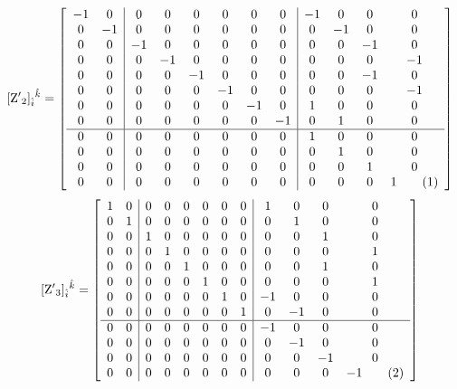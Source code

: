 \documentclass[12pt]{article}
\newcommand\numberthis{\addtocounter{equation}{1}\tag{\theequation}}
\let\bm\relax
\newcommand{\bm}[1]{{\boldsymbol{#1}}}
\begin{document}
\[[{\bm{\rm Z'}_2}]_{\hat i}{}^{\hat k}= 
\left[\begin{array}{cc|cccccc|cccc}
-1 & 0 & 0 & 0 & 0 & 0 & 0 & 0 & -1 & 0 & 0 & 0 \\
 0 & -1 & 0 & 0 & 0 & 0 & 0 & 0 & 0 & -1 & 0 & 0 \\
 0 & 0 & -1 & 0 & 0 & 0 & 0 & 0 & 0 & 0 & -1 & 0 \\
 0 & 0 & 0 & -1 & 0 & 0 & 0 & 0 & 0 & 0 & 0 & -1 \\
 0 & 0 & 0 & 0 & -1 & 0 & 0 & 0 & 0 & 0 & -1 & 0 \\
 0 & 0 & 0 & 0 & 0 & -1 & 0 & 0 & 0 & 0 & 0 & -1 \\
 0 & 0 & 0 & 0 & 0 & 0 & -1 & 0 & 1 & 0 & 0 & 0 \\
 0 & 0 & 0 & 0 & 0 & 0 & 0 & -1 & 0 & 1 & 0 & 0 \\
 \hline
0 & 0 & 0 & 0 & 0 & 0 & 0 & 0 & 1 & 0 & 0 & 0 \\
 0 & 0 & 0 & 0 & 0 & 0 & 0 & 0 & 0 & 1 & 0 & 0 \\
 0 & 0 & 0 & 0 & 0 & 0 & 0 & 0 & 0 & 0 & 1 & 0 \\
 0 & 0 & 0 & 0 & 0 & 0 & 0 & 0 & 0 & 0 & 0 & 1
\numberthis\end{array}\right] \]
\[[{\bm{\rm Z'}_3}]_{\hat i}{}^{\hat k}= 
\left[\begin{array}{cc|cccccc|cccc}
1 & 0 & 0 & 0 & 0 & 0 & 0 & 0 & 1 & 0 & 0 & 0 \\
 0 & 1 & 0 & 0 & 0 & 0 & 0 & 0 & 0 & 1 & 0 & 0 \\
 0 & 0 & 1 & 0 & 0 & 0 & 0 & 0 & 0 & 0 & 1 & 0 \\
 0 & 0 & 0 & 1 & 0 & 0 & 0 & 0 & 0 & 0 & 0 & 1 \\
 0 & 0 & 0 & 0 & 1 & 0 & 0 & 0 & 0 & 0 & 1 & 0 \\
 0 & 0 & 0 & 0 & 0 & 1 & 0 & 0 & 0 & 0 & 0 & 1 \\
 0 & 0 & 0 & 0 & 0 & 0 & 1 & 0 & -1 & 0 & 0 & 0 \\
 0 & 0 & 0 & 0 & 0 & 0 & 0 & 1 & 0 & -1 & 0 & 0 \\
 \hline
 0 & 0 & 0 & 0 & 0 & 0 & 0 & 0 & -1 & 0 & 0 & 0 \\
 0 & 0 & 0 & 0 & 0 & 0 & 0 & 0 & 0 & -1 & 0 & 0 \\
 0 & 0 & 0 & 0 & 0 & 0 & 0 & 0 & 0 & 0 & -1 & 0 \\
 0 & 0 & 0 & 0 & 0 & 0 & 0 & 0 & 0 & 0 & 0 & -1
\numberthis\end{array}\right] \]
\end{document}
